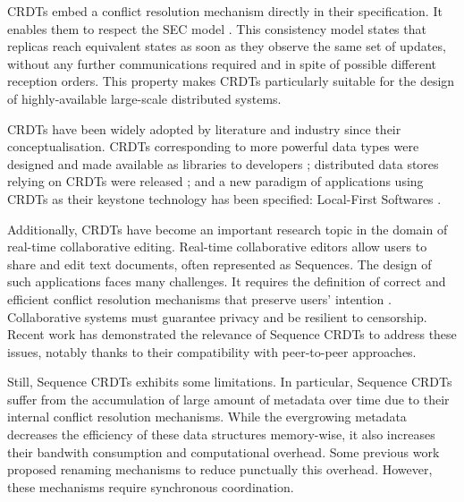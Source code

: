 \documentclass[10pt,journal,compsoc]{IEEEtran}
\begin{document}
\acp{CRDT} embed a conflict resolution mechanism directly in their specification.
It enables them to respect the \ac{SEC} model \cite{shapiro_2011_crdt}.
This consistency model states that replicas reach equivalent states as soon as they observe the same set of updates, without any further communications required and in spite of possible different reception orders.
This property makes \acp{CRDT} particularly suitable for the design of highly-available large-scale distributed systems.

\acp{CRDT} have been widely adopted by literature and industry since their conceptualisation.
\acp{CRDT} corresponding to more powerful data types were designed and made available as libraries to developers \cite{Nicolaescu2016YATA,yjsimplem, jsoncrdt2017, automerge};
distributed data stores relying on \acp{CRDT} were released \cite{RiakKV, AntidoteDB, Anna2021, Concordant};
and a new paradigm of applications using \acp{CRDT} as their keystone technology has been specified: Local-First Softwares \cite{localfirstsoftware2019, pushpin2020}.

Additionally, \acp{CRDT} have become an important research topic in the domain of real-time collaborative editing.
Real-time collaborative editors allow users to share and edit text documents, often represented as Sequences.
The design of such applications faces many challenges.
It requires the definition of correct and efficient conflict resolution mechanisms that preserve users' intention \cite{10.1145/289444.289469}.
Collaborative systems must guarantee privacy and be resilient to censorship.
Recent work \cite{ahmednacer:inria-00629503, Nedelec2016CRATE, MUTE2017} has demonstrated the relevance of Sequence \acp{CRDT} to address these issues, notably thanks to their compatibility with peer-to-peer approaches.

Still, Sequence \acp{CRDT} exhibits some limitations.
In particular, Sequence \acp{CRDT} suffer from the accumulation of large amount of metadata over time due to their internal conflict resolution mechanisms.
While the evergrowing metadata decreases the efficiency of these data structures memory-wise, it also increases their bandwith consumption and computational overhead.
Some previous work proposed renaming mechanisms \cite{letia:hal-01248270,zawirski:hal-01248197} to reduce punctually this overhead.
However, these mechanisms require synchronous coordination.
\end{document}
